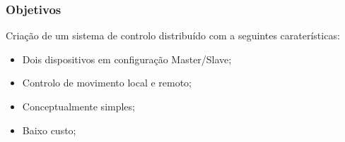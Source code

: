 \begin{frame}
	\frametitle{Objetivos}
	Criaç\~{a}o de um sistema de controlo distribu\'{i}do com a seguintes carater\'{i}sticas:
	\begin{itemize}
		\item Dois dispositivos em configuraç\~{a}o Master/Slave;
		\item Controlo de movimento local e remoto;
		\item Conceptualmente simples;
		\item Baixo custo;
	\end{itemize}
\end{frame}
